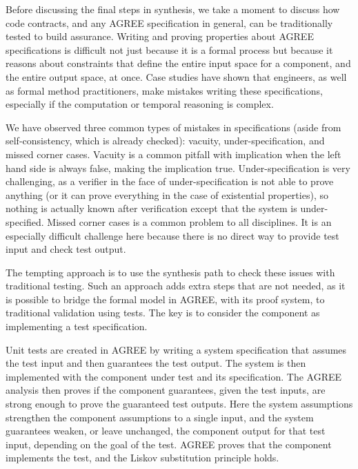 Before discussing the final steps in synthesis, we take a moment to
discuss how code contracts, and any AGREE specification in general, can be traditionally tested to build assurance.
Writing and proving properties about AGREE specifications is difficult not just because it is a formal process but because it reasons about constraints that define the entire input space for a component, and the entire output space, at once.
Case studies have shown that engineers, as well as formal method practitioners, make mistakes writing these specifications, especially if the computation or temporal reasoning is complex.

We have observed three common types of mistakes in specifications (aside from self-consistency, which is
already checked): vacuity, under-specification, and missed corner cases.
Vacuity is a common pitfall with implication when the left hand side is always false, making the implication true. 
Under-specification is very challenging, as a verifier in the face of under-specification is not able to prove anything (or it can prove everything in the case of existential properties), so nothing is actually known after verification except that the system is under-specified. 
Missed corner cases is a common problem to all disciplines.
It is an especially difficult challenge here because there is no direct way to provide test input and check test output.

The tempting approach is to use the synthesis path to check these issues with traditional testing.
Such an approach adds extra steps that are not needed, as it is
possible to bridge the formal model in AGREE, with its proof system, to
traditional validation using tests.
The key is to consider the component as implementing a test specification.

Unit tests are created in AGREE by writing a system specification that assumes the test input and then guarantees the test output.
The system is then implemented with the component under test and its specification.
The AGREE analysis then proves if the component guarantees, given the test inputs, are strong enough to prove the guaranteed test outputs.
Here the system assumptions strengthen the component assumptions to a single input, and the system guarantees weaken, or leave unchanged, the component output for that test input, depending on the goal of the test.
AGREE proves that the component implements the test, and the Liskov substitution principle holds.

